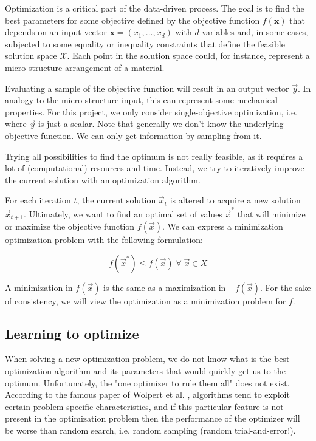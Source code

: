 \documentclass[10pt,a4paper,twoside]{article} %
\begin{document}
Optimization is a critical part of the data-driven process.
The goal is to find the best parameters for some objective defined by the objective function $f(\mathbf{x})$ that depends on an input vector $\mathbf{x} = (x_{1}, ... , x_{d})$ with $d$ variables and, in some cases, subjected to some equality or inequality constraints that define the feasible solution space $\mathcal{X}$. Each point in the solution space could, for instance, represent a micro-structure arrangement of a material.

Evaluating a sample of the objective function will result in an output vector $\vec{y}$. In analogy to the micro-structure input, this can represent some mechanical properties. For this project, we only consider single-objective optimization, i.e. where $\vec{y}$ is just a scalar. Note that generally we don't know the underlying objective function. We can only get information by sampling from it.

Trying all possibilities to find the optimum is not really feasible, as it requires a lot of (computational) resources and time. Instead, we try to iteratively improve the current solution with an optimization algorithm.

For each iteration $t$, the current solution $\vec{x}_{t}$ is altered to acquire a new solution $\vec{x}_{t+1}$. Ultimately, we want to find an optimal set of values $\vec{x}^{*}$ that will minimize or maximize the objective function $f(\vec{x})$. We can express a minimization optimization problem with the following formulation:

\begin{equation}
f(\vec{x}^{*}) \leq f(\vec{x}) \; \forall \; \vec{x} \in X
\end{equation}

A minimization in $f(\vec{x})$ is the same as a maximization in $-f(\vec{x})$. For the sake of consistency, we will view the optimization as a minimization problem for $f$. 

\subsection*{Learning to optimize}

When solving a new optimization problem, we do not know what is the best optimization algorithm and its parameters that would quickly get us to the optimum. Unfortunately, the "one optimizer to rule them all" does not exist. According to the famous paper of Wolpert et al. \cite{Wolpert1997}, algorithms tend to exploit certain problem-specific characteristics, and if this particular feature is not present in the optimization problem then the performance of the optimizer will be worse than random search, i.e. random sampling (random trial-and-error!).
\end{document}
